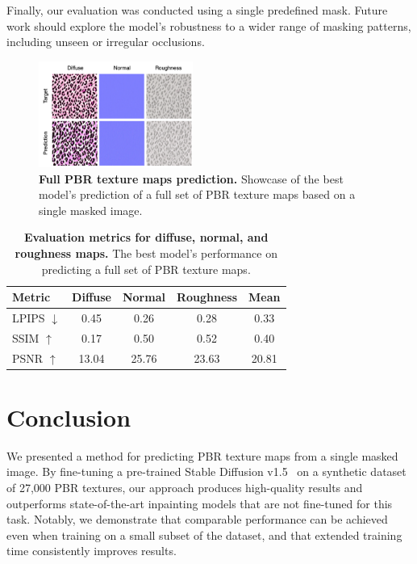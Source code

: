 \documentclass[11pt,twocolumn]{article}
\begin{document}
Finally, our evaluation was conducted using a single predefined mask. Future work should explore the 
model's robustness to a wider range of masking patterns, including unseen or irregular occlusions.


\begin{figure}[t]
  \centering
  \includegraphics[width=0.45\textwidth]{figures/full_pbr_showcase.png}
  \caption{\textbf{Full PBR texture maps prediction.} Showcase of the best model's prediction of a full set of PBR texture maps 
  based on a single masked image.}
  \label{fig:full-pbr-showcase}
\end{figure}

\begin{table}[t]
  \centering
  \begin{tabular}{l | ccc | c}
    \toprule
    \textbf{Metric} & \textbf{Diffuse} & \textbf{Normal} & \textbf{Roughness} & \textbf{Mean} \\
    \midrule
    LPIPS $\downarrow$ & 0.45 & 0.26 & 0.28 & 0.33 \\
    SSIM $\uparrow$ & 0.17 & 0.50 & 0.52 & 0.40 \\
    PSNR $\uparrow$ & 13.04 & 25.76 & 23.63 & 20.81 \\
    \bottomrule
    \end{tabular}
  \caption{\textbf{Evaluation metrics for diffuse, normal, and roughness maps.} 
  The best model's performance on predicting a full set of PBR texture maps.}
  \label{tab:full-pbr-metrics}
\end{table}


\section{Conclusion}
We presented a method for predicting PBR texture maps from a single masked image. 
By fine-tuning a pre-trained Stable Diffusion v1.5~\cite{sd} on a synthetic dataset of 
27,000 PBR textures, our approach produces high-quality results and outperforms state-of-the-art 
inpainting models that are not fine-tuned for this task. Notably, we demonstrate that comparable 
performance can be achieved even when training on a small subset of the dataset, and that 
extended training time consistently improves results.
\end{document}
